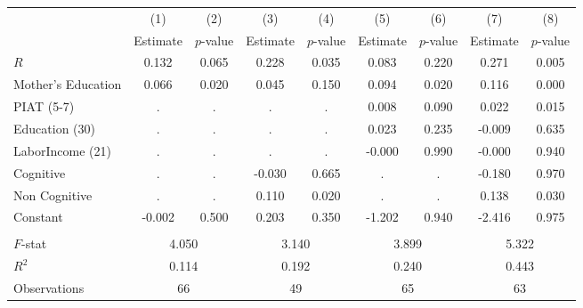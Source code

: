 \begin{tabular}{lcccccccc} \toprule
 & (1) & (2) & (3) & (4) & (5) & (6) & (7) & (8) \\ 
 & Estimate  & $p$-value  & Estimate  & $p$-value  & Estimate  & $p$-value  & Estimate  & $p$-value  \\  \midrule
$R$ &     0.132 &     0.065 &     0.228 &     0.035 &     0.083 &     0.220 &     0.271 &     0.005 \\  
Mother's Education &     0.066 &     0.020 &     0.045 &     0.150 &     0.094 &     0.020 &     0.116 &     0.000 \\  
PIAT (5-7) &         . &         . &         . &         . &     0.008 &     0.090 &     0.022 &     0.015 \\  
Education (30) &         . &         . &         . &         . &     0.023 &     0.235 &    -0.009 &     0.635 \\  
LaborIncome (21) &         . &         . &         . &         . &    -0.000 &     0.990 &    -0.000 &     0.940 \\  
Cognitive &         . &         . &    -0.030 &     0.665 &         . &         . &    -0.180 &     0.970 \\  
Non Cognitive &         . &         . &     0.110 &     0.020 &         . &         . &     0.138 &     0.030 \\  
Constant &    -0.002 &     0.500 &     0.203 &     0.350 &    -1.202 &     0.940 &    -2.416 &     0.975 \\  \\ \midrule
$F$-stat &     \multicolumn{2}{c}{4.050} &             \multicolumn{2}{c}{3.140} &              \multicolumn{2}{c}{3.899} &              \multicolumn{2}{c}{5.322} \\  
$R^2$ &     \multicolumn{2}{c}{0.114} &            \multicolumn{2}{c}{0.192} &             \multicolumn{2}{c}{0.240} &              \multicolumn{2}{c}{0.443} \\  
Observations &    \multicolumn{2}{c}{66} &            \multicolumn{2}{c}{49} &             \multicolumn{2}{c}{65} &             \multicolumn{2}{c}{63} \\  \bottomrule \end{tabular}
